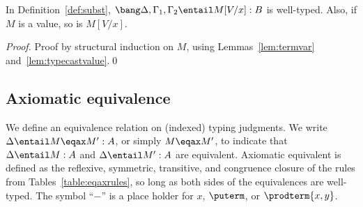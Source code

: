 \documentclass{llncs}
\begin{document}
\begin{lemma}\label{lem:valuesubstisvalue}
  In Definition~\ref{def:subst},
  $\bang\Delta,\Gamma_1,\Gamma_2\entail M[V/x]:B$ is well-typed. Also,
  if $M$ is a value, so is $M[V/x]$.
\end{lemma}

\begin{proof}
  Proof by structural induction on $M$, using
  Lemmas~\ref{lem:termvar} and~\ref{lem:typecastvalue}.\qed
\end{proof}


\subsection{Axiomatic equivalence}

We define an equivalence relation on (indexed) typing judgments.  We
write $\Delta\entail M\eqax M':A$, or simply $M\eqax M'$, to indicate
that $\Delta\entail M:A$ and $\Delta\entail M':A$ are equivalent.
Axiomatic equivalent is defined as the reflexive, symmetric,
transitive, and congruence closure of the rules from
Tables~\ref{table:eqaxrules}, so
long as both sides of the equivalences are well-typed.
The symbol ``$-$'' is a place holder
for $x$, $\puterm$, or $\prodterm{x,y}$.
\end{document}
